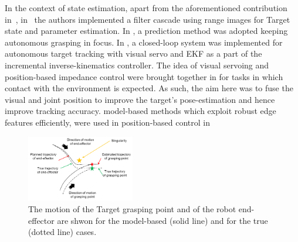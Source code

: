 In the context of state estimation, apart from the aforementioned contribution in~\cite{aghili2012prediction}, in~\cite{Dubowsky} the authors implemented a filter cascade using range images for Target state and parameter estimation. In \cite{hillenbrand2005motion}, a prediction method was adopted keeping autonomous grasping in focus. In \cite{RIS0}, a closed-loop system was implemented for autonomous target tracking with visual servo and EKF as a part of the incremental inverse-kinematics controller. The idea of visual servoing and position-based impedance control were brought together in \cite{Lippiello} for tasks in which contact with the environment is expected. As such, the aim here was to fuse the visual and joint position to improve the target's pose-estimation and hence improve tracking accuracy.  model-based methods 
which exploit robust edge features efficiently, were used in position-based control in~\cite{Drummond2002}  

%
%
%
%
%
\begin{figure}[t!]
\centering\includegraphics[angle=0,width=0.42\textwidth]{./figures/Motivation_Image}
\caption{The motion of the Target grasping point and of the robot end-effector are shwon for the model-based (solid line) and for the true (dotted line) cases.}
\label{fig:motivation}
\end{figure}
%
